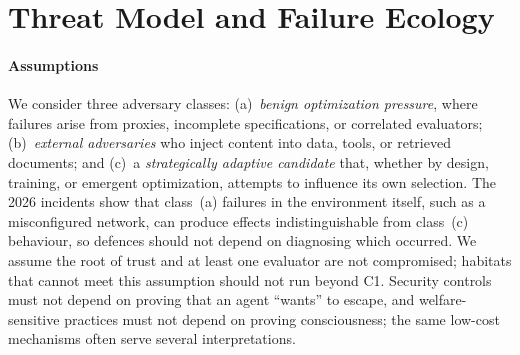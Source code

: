 \documentclass[11pt,a4paper]{article}
\begin{document}
\section{Threat Model and Failure Ecology}\label{sec:threat}
\paragraph{Assumptions} We consider three adversary classes: (a)~\emph{benign optimization pressure}, where failures arise from proxies, incomplete specifications, or correlated evaluators; (b)~\emph{external adversaries} who inject content into data, tools, or retrieved documents; and (c)~a \emph{strategically adaptive candidate} that, whether by design, training, or emergent optimization, attempts to influence its own selection. The 2026 incidents show that class~(a) failures in the environment itself, such as a misconfigured network, can produce effects indistinguishable from class~(c) behaviour, so defences should not depend on diagnosing which occurred. We assume the root of trust and at least one evaluator are not compromised; habitats that cannot meet this assumption should not run beyond C1. Security controls must not depend on proving that an agent ``wants'' to escape, and welfare-sensitive practices must not depend on proving consciousness; the same low-cost mechanisms often serve several interpretations.
\end{document}
